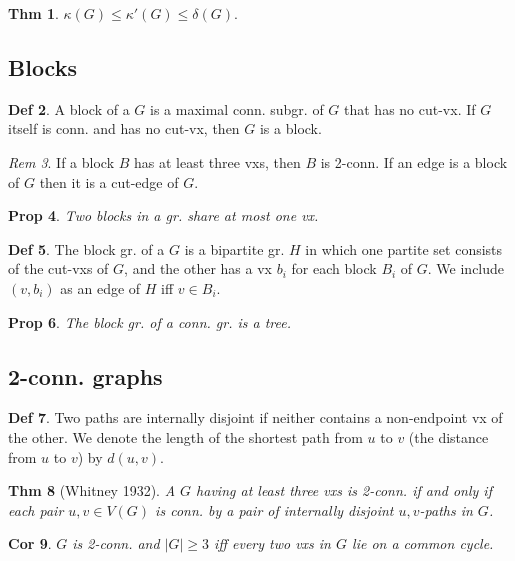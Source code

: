 \documentclass[11pt, fleqn, a4paper, landscape]{article}
\theoremstyle{plain} %
\newtheorem{thm}{Thm}
\newtheorem{pro}[thm]{Prop}
\newtheorem{cor}[thm]{Cor}
\theoremstyle{remark} %
\newtheorem{rem}[thm]{Rem}
\theoremstyle{definition} %
\newtheorem{defi}[thm]{Def}
\begin{document}
\begin{multicols}{5}
\begin{thm}
$\kappa (G) \le \kappa'(G) \le \delta(G).$
\end{thm}

\subsection{Blocks}
\begin{defi}
A block of a $G$ is a maximal conn. subgr. of $G$ that has no cut-vx.
If $G$ itself is conn. and has no cut-vx, then $G$ is a block.
\end{defi}
\addtocounter{thm}{1}
\begin{rem}
If a block $B$ has at least three vxs, then $B$ is 2-conn. If an edge is a block of $G$ then it is a cut-edge of $G$.
\end{rem}

\begin{pro}
Two blocks in a gr. share at most one vx.
\end{pro}

\begin{defi}
The block gr. of a $G$ is a bipartite gr. $H$ in which one partite set consists of the cut-vxs of $G$, and the other has a vx $b_i$ for each block $B_i$ of $G$. We include $(v, b_i)$ as an edge of $H$ iff $v \in B_i.$
\end{defi}
\addtocounter{thm}{1}
\begin{pro}
The block gr. of a conn. gr. is a tree.
\end{pro}

\subsection{2-conn. graphs}

\begin{defi}
Two paths are internally disjoint if neither contains a non-endpoint vx of the other. We denote the length of the shortest path from $u$ to $v$ (the distance from $u$ to $v$) by $d(u, v)$.
\end{defi}

\begin{thm}[Whitney 1932]
A $G$ having at least three vxs is 2-conn. if and only
if each pair $u, v \in V (G)$ is conn. by a pair of internally disjoint $u, v$-paths in $G$.
\end{thm}

\begin{cor}
$G$ is 2-conn. and $|G|\ge 3$ iff every two vxs in $G$ lie on a common cycle.
\end{cor}

\end{multicols}
\end{document}
